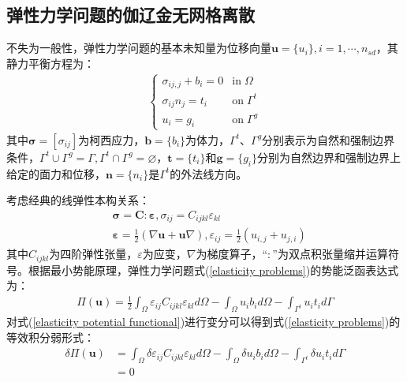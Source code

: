 \subsection{弹性力学问题的伽辽金无网格离散}
不失为一般性，弹性力学问题的基本未知量为位移向量$\pmb{u}=\{u_i\},i=1,\dotsb,n_{sd}$，其静力平衡方程为：
\begin{equation}\label{elasticity problems}
\begin{split}
\begin{cases}
    \sigma_{ij,j}+b_i=0&\text{in}\;\Omega\\
    \sigma_{ij}n_j=t_i&\text{on}\;\Gamma^t\\
    u_i=g_i&\text{on}\;\Gamma^g
\end{cases}
\end{split}
\end{equation}
其中$\pmb \sigma=[\sigma_{ij}]$为柯西应力，$\pmb{b}=\{b_i\}$为体力，$\Gamma^t \text{、}\Gamma^g$分别表示为自然和强制边界条件，$\Gamma^t\cup \Gamma^g=\Gamma,\Gamma^t\cap \Gamma^g=\varnothing$，$\pmb{t}=\{t_i\}$和$\pmb{g}=\{g_i\}$分别为自然边界和强制边界上给定的面力和位移，$\pmb{n}=\{n_i\}$是$\Gamma^{t}$的外法线方向。\par
考虑经典的线弹性本构关系：
\begin{equation}\label{constitutive relation}
\begin{split}
        &\pmb{\sigma}=\pmb{C}\pmb{:}\pmb{\varepsilon},\sigma_{ij}=C_{ijkl}\varepsilon_{kl}\\
        &\pmb{\varepsilon}=\frac{1}{2}(\nabla \pmb{u}+\pmb{u}\nabla),\varepsilon_{ij}=\frac{1}{2}(u_{i,j}+u_{j,i})
\end{split}
\end{equation}
其中$C_{ijkl}$为四阶弹性张量，$\varepsilon$为应变，$\nabla$为梯度算子，“$\pmb{:}$”为双点积张量缩并运算符号。根据最小势能原理，弹性力学问题式(\ref{elasticity problems})的势能泛函表达式为：
\begin{equation}\label{elasticity potential functional}
\begin{split}
    \Pi(\pmb{u})=\frac{1}{2}\int_{\Omega}\varepsilon_{ij}C_{ijkl}\varepsilon_{kl}d\Omega-\int_{\Omega}u_ib_id\Omega-\int_{\Gamma^t}u_it_id\Gamma
\end{split}
\end{equation}
对式(\ref{elasticity potential functional})进行变分可以得到式(\ref{elasticity problems})的等效积分弱形式：
\begin{equation}\label{elasticity weak form}
\begin{split}
    \delta\Pi(\pmb{u})&=\int_{\Omega}\delta\varepsilon_{ij}C_{ijkl}\varepsilon_{kl}d\Omega-\int_{\Omega}\delta u_ib_id\Omega-\int_{\Gamma^t}\delta u_it_id\Gamma\\
   &=0
\end{split}
\end{equation}\par
